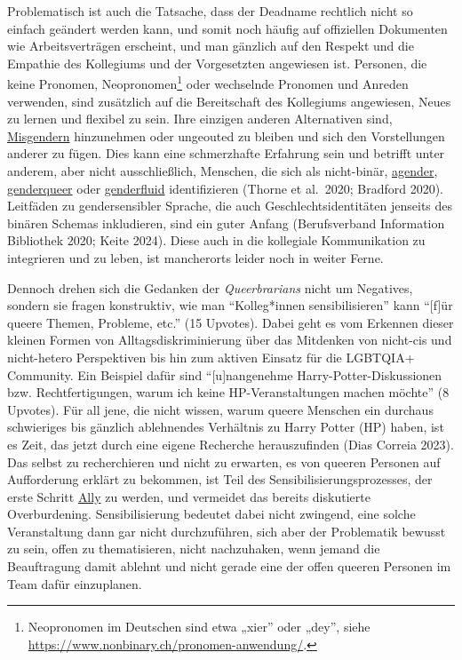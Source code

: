 \documentclass[a4paper,
fontsize=11pt,
oneside,
numbers=noperiodatend,
parskip=half-,
bibliography=totoc,
final
]{scrartcl}
\begin{document}
Problematisch ist auch die Tatsache, dass der Deadname rechtlich nicht
so einfach geändert werden kann, und somit noch häufig auf offiziellen
Dokumenten wie Arbeitsverträgen erscheint, und man gänzlich auf den
Respekt und die Empathie des Kollegiums und der Vorgesetzten angewiesen
ist. Personen, die keine Pronomen, Neopronomen\footnote{Neopronomen im
  Deutschen sind etwa „xier'' oder „dey'', siehe
  \url{https://www.nonbinary.ch/pronomen-anwendung/}.} oder wechselnde
Pronomen und Anreden verwenden, sind zusätzlich auf die Bereitschaft des
Kollegiums angewiesen, Neues zu lernen und flexibel zu sein. Ihre
einzigen anderen Alternativen sind,
\href{https://queer-lexikon.net/2020/04/29/misgendern/}{Misgendern}
hinzunehmen oder ungeouted zu bleiben und sich den Vorstellungen anderer
zu fügen. Dies kann eine schmerzhafte Erfahrung sein und betrifft unter
anderem, aber nicht ausschließlich, Menschen, die sich als nicht-binär,
\href{https://lgbtqia.fandom.com/wiki/Agender}{agender},
\href{https://lgbtqia.fandom.com/wiki/Genderqueer}{genderqueer} oder
\href{https://lgbtqia.fandom.com/wiki/Genderfluid}{genderfluid}
identifizieren (Thorne et al.~2020; Bradford 2020). Leitfäden zu
gendersensibler Sprache, die auch Geschlechtsidentitäten jenseits des
binären Schemas inkludieren, sind ein guter Anfang (Berufsverband
Information Bibliothek 2020; Keite 2024). Diese auch in die kollegiale
Kommunikation zu integrieren und zu leben, ist mancherorts leider noch
in weiter Ferne.

Dennoch drehen sich die Gedanken der \emph{Queerbrarians} nicht um
Negatives, sondern sie fragen konstruktiv, wie man \enquote{Kolleg*innen
sensibilisieren} kann \enquote{{[}f{]}ür queere Themen, Probleme, etc.}
(15 Upvotes). Dabei geht es vom Erkennen dieser kleinen Formen von
Alltagsdiskriminierung über das Mitdenken von nicht-cis und nicht-hetero
Perspektiven bis hin zum aktiven Einsatz für die LGBTQIA+ Community. Ein
Beispiel dafür sind \enquote{{[}u{]}nangenehme Harry-Potter-Diskussionen
bzw. Rechtfertigungen, warum ich keine HP-Veranstaltungen machen möchte}
(8 Upvotes). Für all jene, die nicht wissen, warum queere Menschen ein
durchaus schwieriges bis gänzlich ablehnendes Verhältnis zu Harry Potter
(HP) haben, ist es Zeit, das jetzt durch eine eigene Recherche
herauszufinden (Dias Correia 2023). Das selbst zu recherchieren und
nicht zu erwarten, es von queeren Personen auf Aufforderung erklärt zu
bekommen, ist Teil des Sensibilisierungsprozesses, der erste Schritt
\href{https://lgbtqia.mywikis.wiki/wiki/Ally}{Ally} zu werden, und
vermeidet das bereits diskutierte Overburdening. Sensibilisierung
bedeutet dabei nicht zwingend, eine solche Veranstaltung dann gar nicht
durchzuführen, sich aber der Problematik bewusst zu sein, offen zu
thematisieren, nicht nachzuhaken, wenn jemand die Beauftragung damit
ablehnt und nicht gerade eine der offen queeren Personen im Team dafür
einzuplanen.
\end{document}
